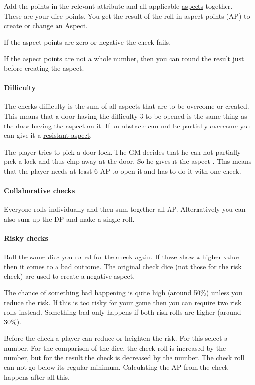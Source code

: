 \documentclass[11pt]{article}
\begin{document}
{Add the points in the relevant attribute and all applicable \hyperref[sec:org3a13177]{aspects} together. These are your dice points. You get the result of the roll in aspect points (AP) to create or change an Aspect.

If the aspect points are zero or negative the check fails.

If the aspect points are not a whole number, then you can round the result just before creating the aspect.
\paragraph*{Difficulty}
\label{sec:org01cac8c}
The checks difficulty is the sum of all aspects that are to be overcome or created. This means that a door having the difficulty 3 to be opened is the same thing as the door having the aspect  on it. If an obstacle can not be partially overcome you can give it a \hyperref[sec:org1ce70b8]{resistant aspect}.

\begin{pwexample}
The player tries to pick a door lock. The GM decides that he can not partially pick a lock and thus chip away at the door. So he gives it the aspect . This means that the player needs at least 6 AP to open it and has to do it with one check.
\end{pwexample}
\paragraph*{Collaborative checks}
\label{sec:org92c58ac}
Everyone rolls individually and then sum together all AP. Alternatively you can also sum up the DP and make a single roll.
\paragraph*{Risky checks}
\label{sec:orgfc629d3}
Roll the same dice you rolled for the check again. If these show a higher value then it comes to a bad outcome. The original check dice (not those for the risk check) are used to create a negative aspect.

The chance of something bad happening is quite high (around 50\%) unless you reduce the risk. If this is too risky for your game then you can require two risk rolls instead. Something bad only happens if both risk rolls are higher (around 30\%). 

Before the check a player can reduce or heighten the risk. For this select a number. For the comparison of the dice, the check roll is increased by the number, but for the result the check is decreased by the number. The check roll can not go below its regular minimum. Calculating the AP from the check happens after all this.
}
\end{document}
